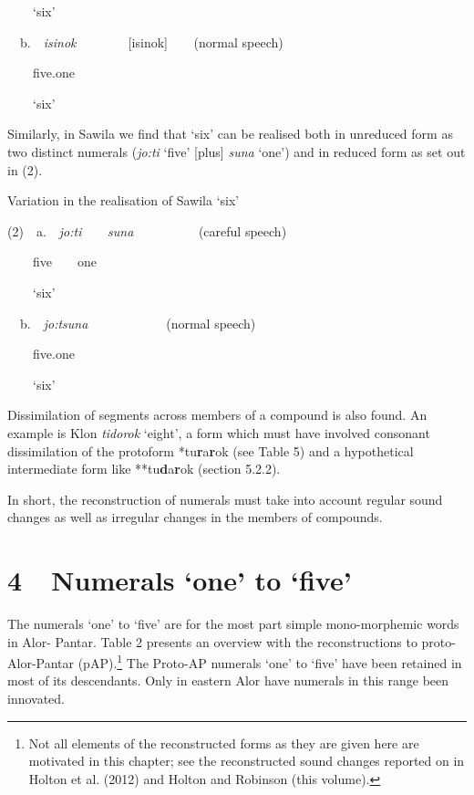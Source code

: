 \ \ \ \ {\textquoteleft}six{\textquoteright}

  \ \ b.\ \ \textit{isi}\textit{{\ng}}\textit{nok\ \ \ \ \ \ \ \ }[i{\textquotesingle}si{\ng}nok]\textit{\ \ \ \ }(normal speech)

\ \ \ \ five.one

\ \ \ \ {\textquoteleft}six{\textquoteright}

Similarly, in Sawila we find that {\textquoteleft}six{\textquoteright} can be realised both in unreduced form as two distinct numerals (\textit{jo:ti}\textit{{\ng}}\textit{ }{\textquoteleft}five{\textquoteright} [plus] \textit{suna} {\textquoteleft}one{\textquoteright}) and in reduced form as set out in (2).  

Variation in the realisation of Sawila {\textquoteleft}six{\textquoteright}

(2)\ \ a.\ \ \textit{jo:ti}\textit{{\ng}}\textit{\ \ \ \ suna\ \ \ \ \ \ \ \ \ \ }(careful speech)

\ \ \ \ five\ \ \ \ one\ \ 

\ \ \ \ {\textquoteleft}six{\textquoteright}

  \ \ b.\ \ \textit{jo:tsuna\ \ \ \ \ \ \ \ \ \ \ \ }(normal speech)

\ \ \ \ five.one

\ \ \ \ {\textquoteleft}six{\textquoteright}

Dissimilation of segments across members of a compound is also found. An example is Klon \textit{tidorok} {\textquoteleft}eight{\textquoteright}, a form which must have involved consonant dissimilation of the protoform *tu\textbf{r}a\textbf{r}ok (see Table 5) and a hypothetical intermediate form like **tu\textbf{d}a\textbf{r}ok (section 5.2.2).

In short, the reconstruction of numerals must take into account regular sound changes as well as irregular changes in the members of compounds. 

\section[4\ \ Numerals {\textquoteleft}one{\textquoteright} to {\textquoteleft}five{\textquoteright}]{4\ \ Numerals {\textquoteleft}one{\textquoteright} to {\textquoteleft}five{\textquoteright}}
The numerals {\textquoteleft}one{\textquoteright} to {\textquoteleft}five{\textquoteright} are for the most part simple mono-morphemic words in Alor- Pantar. Table 2 presents an overview with the reconstructions to proto-Alor-Pantar (pAP).\footnote{Not all elements of the reconstructed forms as they are given here are motivated in this chapter; see the reconstructed sound changes reported on in Holton et al. (2012) and Holton and Robinson (this volume). } The Proto-AP numerals {\textquoteleft}one{\textquoteright} to {\textquoteleft}five{\textquoteright} have been retained in most of its descendants. Only in eastern Alor have numerals in this range been innovated. 

